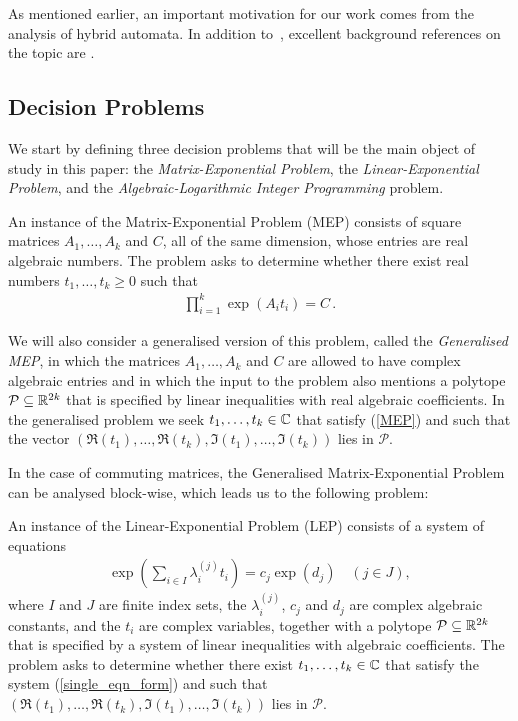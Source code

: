 As mentioned earlier, an important motivation for our work comes from
the analysis of hybrid automata. In addition to~\cite{Alu15},
excellent background references on the topic are
\cite{HenzingerSTOC,HenzingerLICS}.

\subsection{Decision Problems}

We start by defining three decision problems that will be the main
object of study in this paper: the \emph{Matrix-Exponential Problem},
the \emph{Linear-Exponential Problem}, and the
\emph{Algebraic-Logarithmic Integer Programming} problem.

\begin{definition}
  An instance of the Matrix-Exponential Problem (MEP) consists of
  square matrices $A_{1}, \ldots, A_{k}$ and $C$, all of the same
  dimension, whose entries are real algebraic numbers.  The problem
asks to determine whether there exist real numbers
$t_1,\ldots,t_k \geq 0$ such that
\begin{align}
\label{MEP}
\prod \limits_{i=1}^{k} \exp(A_{i} t_{i}) = C \, .
\end{align}
\label{def:MEP}
\end{definition}

We will also consider a generalised version of this problem, called
the \emph{Generalised MEP}, in which the matrices $A_1,\ldots,A_k$ and
$C$ are allowed to have complex algebraic entries and in which the
input to the problem also mentions a polytope
$\mathcal{P}\subseteq\mathbb{R}^{2k}$ that is specified by linear
inequalities with real algebraic coefficients.  In the generalised problem
we seek $t_1,\ldots,t_k \in \mathbb{C}$ that satisfy (\ref{MEP}) and
such that the vector
$(\Re(t_1),\ldots,\Re(t_k),
\Im(t_1),\ldots,\Im(t_k))$ lies in $\mathcal{P}$.

In the case of commuting matrices, the Generalised Matrix-Exponential
Problem can be analysed block-wise, which leads us to the following
problem:

\begin{definition}
  An instance of the Linear-Exponential Problem (LEP) consists of a system
  of equations
\begin{align}
\label{single_eqn_form}
  \exp\left(\sum_{i \in I} \lambda_i^{(j)} t_i \right) = c_j \exp (d_j)
\quad (j \in J),
\end{align}
where $I$ and $J$ are finite index sets, the $\lambda_i^{(j)}$, $c_j$
and $d_j$ are complex algebraic constants, and the $t_i$ are complex
variables, together with a polytope
$\mathcal{P} \subseteq \mathbb{R}^{2k}$ that is specified by a system
of linear inequalities with algebraic coefficients.  The problem asks
to determine whether there exist $t_1,\ldots,t_k\in \mathbb{C}$ that
satisfy the system (\ref{single_eqn_form}) and such that
$(\Re(t_1),\ldots,\Re(t_k),\Im(t_1),\ldots,\Im(t_k))$
lies in $\mathcal{P}$.
\label{def:LEP}
\end{definition}

